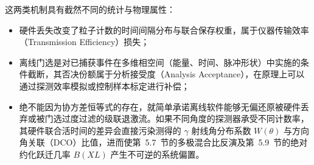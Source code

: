 这两类机制具有截然不同的统计与物理属性：
\begin{itemize}
\item 硬件丢失改变了粒子计数的时间间隔分布与联合保存权重，属于仪器传输效率（Transmission Efficiency）损失；
\item 离线门选是对已捕获事件在多维相空间（能量、时间、脉冲形状）中实施的条件截断，其否决份额属于分析接受度（Analysis Acceptance），在原理上可以通过探测效率模拟或控制样本标定进行补偿；
\item 绝不能因为协方差恒等式的存在，就简单承诺离线软件能够无偏还原被硬件丢弃或被门选过度过滤的级联退激流。如果不同角度的探测器承受不同计数率，其硬件联合活时间的差异会直接污染测得的 $\gamma$ 射线角分布系数 $W(\theta)$ 与方向角关联（DCO）比值，进而使第~5.7~节的多极混合比反演及第~5.9~节的绝对约化跃迁几率 $B(XL)$ 产生不可逆的系统偏置。
\end{itemize}
